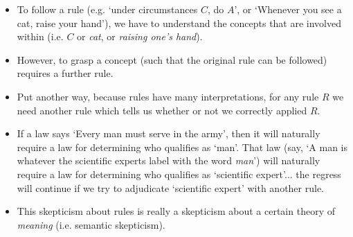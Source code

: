 \begin{itemize}
\item To follow a rule (e.g. `under circumstances $C$, do $A$', or `Whenever you see a cat, raise your hand'), we have to understand the concepts that are involved within (i.e. $C$ or \emph{cat}, or \emph{raising one's hand}).
\item However, to grasp a concept (such that the original rule can be followed) requires a further rule.
\item Put another way, because rules have many interpretations, for any rule $R$ we need another rule which tells us whether or not we correctly applied $R$.
\item If a law says `Every man must serve in the army', then it will naturally require a law for determining who qualifies as `man'. That law (say, `A man is whatever the scientific experts label with the word \emph{man}') will naturally require a law for determining who qualifies as `scientific expert'... the regress will continue if we try to adjudicate `scientific expert' with another rule.
\item This skepticism about rules is really a skepticism about a certain theory of \emph{meaning} (i.e. semantic skepticism).
\end{itemize}